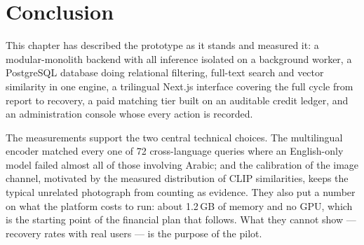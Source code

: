 \section{Conclusion}

This chapter has described the prototype as it stands and measured it: a
modular-monolith backend with all inference isolated on a background worker, a
PostgreSQL database doing relational filtering, full-text search and vector
similarity in one engine, a trilingual Next.js interface covering the full cycle
from report to recovery, a paid matching tier built on an auditable credit
ledger, and an administration console whose every action is recorded.

The measurements support the two central technical choices. The multilingual
encoder matched every one of 72 cross-language queries where an English-only
model failed almost all of those involving Arabic; and the calibration of the
image channel, motivated by the measured distribution of CLIP similarities,
keeps the typical unrelated photograph from counting as evidence. They also put
a number on what the platform costs to run: about 1.2\,GB of memory and no GPU,
which is the starting point of the financial plan that follows. What they cannot
show --- recovery rates with real users --- is the purpose of the pilot.
